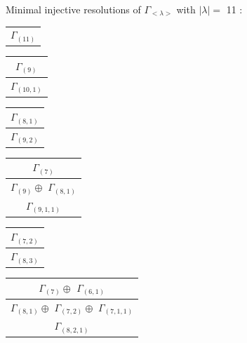 \documentclass[main.tex]{subfiles}
\begin{document}
\bigskip
Minimal injective resolutions of $\Gamma_{<\lambda>}$ with $|\lambda| = $ 11 : \\
\begin{minipage}{.2\textwidth}
\centering
\begin{tabular}{c}
$\Gamma_{(
11
)}$
\\
\end{tabular}\end{minipage}
\begin{minipage}{.2\textwidth}
\centering
\begin{tabular}{c}
$\Gamma_{(
9
)}$
\\ \hline
$\Gamma_{(
10 , 
1
)}$
\\
\end{tabular}\end{minipage}
\begin{minipage}{.2\textwidth}
\centering
\begin{tabular}{c}
$\Gamma_{(
8 , 
1
)}$
\\ \hline
$\Gamma_{(
9 , 
2
)}$
\\
\end{tabular}\end{minipage}
\begin{minipage}{.2\textwidth}
\centering
\begin{tabular}{c}
$\Gamma_{(
7
)}$
\\ \hline
$\Gamma_{(
9
)} \oplus$
$\Gamma_{(
8 , 
1
)}$
\\ \hline
$\Gamma_{(
9 , 
1 , 
1
)}$
\\
\end{tabular}\end{minipage}
\begin{minipage}{.2\textwidth}
\centering
\begin{tabular}{c}
$\Gamma_{(
7 , 
2
)}$
\\ \hline
$\Gamma_{(
8 , 
3
)}$
\\
\end{tabular}\end{minipage}
\bigskip
\begin{minipage}{.3\textwidth}
\centering
\begin{tabular}{c}
$\Gamma_{(
7
)} \oplus$
$\Gamma_{(
6 , 
1
)}$
\\ \hline
$\Gamma_{(
8 , 
1
)} \oplus$
$\Gamma_{(
7 , 
2
)} \oplus$
$\Gamma_{(
7 , 
1 , 
1
)}$
\\ \hline
$\Gamma_{(
8 , 
2 , 
1
)}$
\\
\end{tabular}\end{minipage}
\end{document}
